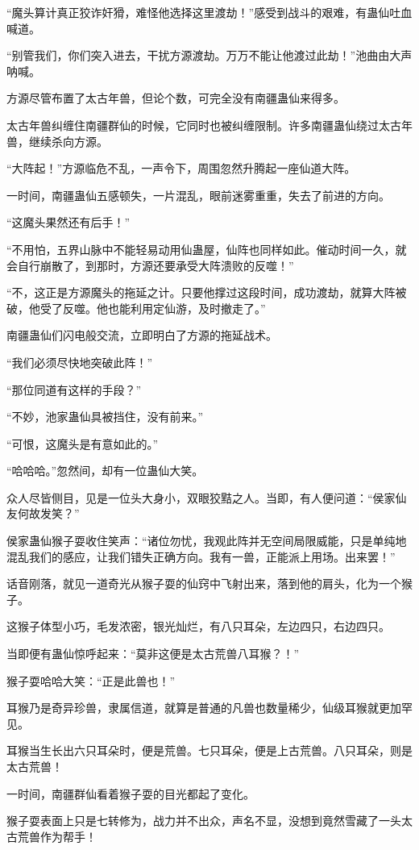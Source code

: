 \begin{this_body}
“魔头算计真正狡诈奸猾，难怪他选择这里渡劫！”感受到战斗的艰难，有蛊仙吐血喊道。

“别管我们，你们突入进去，干扰方源渡劫。万万不能让他渡过此劫！”池曲由大声呐喊。

方源尽管布置了太古年兽，但论个数，可完全没有南疆蛊仙来得多。

太古年兽纠缠住南疆群仙的时候，它同时也被纠缠限制。许多南疆蛊仙绕过太古年兽，继续杀向方源。

“大阵起！”方源临危不乱，一声令下，周围忽然升腾起一座仙道大阵。

一时间，南疆蛊仙五感顿失，一片混乱，眼前迷雾重重，失去了前进的方向。

“这魔头果然还有后手！”

“不用怕，五界山脉中不能轻易动用仙蛊屋，仙阵也同样如此。催动时间一久，就会自行崩散了，到那时，方源还要承受大阵溃败的反噬！”

“不，这正是方源魔头的拖延之计。只要他撑过这段时间，成功渡劫，就算大阵被破，他受了反噬。他也能利用定仙游，及时撤走了。”

南疆蛊仙们闪电般交流，立即明白了方源的拖延战术。

“我们必须尽快地突破此阵！”

“那位同道有这样的手段？”

“不妙，池家蛊仙具被挡住，没有前来。”

“可恨，这魔头是有意如此的。”

“哈哈哈。”忽然间，却有一位蛊仙大笑。

众人尽皆侧目，见是一位头大身小，双眼狡黠之人。当即，有人便问道：“侯家仙友何故发笑？”

侯家蛊仙猴子耍收住笑声：“诸位勿忧，我观此阵并无空间局限威能，只是单纯地混乱我们的感应，让我们错失正确方向。我有一兽，正能派上用场。出来罢！”

话音刚落，就见一道奇光从猴子耍的仙窍中飞射出来，落到他的肩头，化为一个猴子。

这猴子体型小巧，毛发浓密，银光灿烂，有八只耳朵，左边四只，右边四只。

当即便有蛊仙惊呼起来：“莫非这便是太古荒兽八耳猴？！”

猴子耍哈哈大笑：“正是此兽也！”

耳猴乃是奇异珍兽，隶属信道，就算是普通的凡兽也数量稀少，仙级耳猴就更加罕见。

耳猴当生长出六只耳朵时，便是荒兽。七只耳朵，便是上古荒兽。八只耳朵，则是太古荒兽！

一时间，南疆群仙看着猴子耍的目光都起了变化。

猴子耍表面上只是七转修为，战力并不出众，声名不显，没想到竟然雪藏了一头太古荒兽作为帮手！


\end{this_body}
